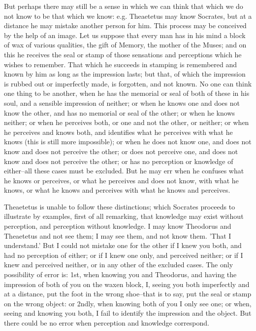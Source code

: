 But perhaps there may still be a sense in which we can think that
which we do not know to be that which we know: e.g. Theaetetus may know
Socrates, but at a distance he may mistake another person for him. This
process may be conceived by the help of an image. Let us suppose that
every man has in his mind a block of wax of various qualities, the gift
of Memory, the mother of the Muses; and on this he receives the seal or
stamp of those sensations and perceptions which he wishes to remember.
That which he succeeds in stamping is remembered and known by him as
long as the impression lasts; but that, of which the impression is
rubbed out or imperfectly made, is forgotten, and not known. No one can
think one thing to be another, when he has the memorial or seal of both
of these in his soul, and a sensible impression of neither; or when he
knows one and does not know the other, and has no memorial or seal of
the other; or when he knows neither; or when he perceives both, or one
and not the other, or neither; or when he perceives and knows both,
and identifies what he perceives with what he knows (this is still more
impossible); or when he does not know one, and does not know and does
not perceive the other; or does not perceive one, and does not know
and does not perceive the other; or has no perception or knowledge
of either--all these cases must be excluded. But he may err when he
confuses what he knows or perceives, or what he perceives and does not
know, with what he knows, or what he knows and perceives with what he
knows and perceives.

Theaetetus is unable to follow these distinctions; which Socrates
proceeds to illustrate by examples, first of all remarking, that
knowledge may exist without perception, and perception without
knowledge. I may know Theodorus and Theaetetus and not see them; I
may see them, and not know them. 'That I understand.' But I could not
mistake one for the other if I knew you both, and had no perception of
either; or if I knew one only, and perceived neither; or if I knew
and perceived neither, or in any other of the excluded cases. The only
possibility of error is: 1st, when knowing you and Theodorus, and having
the impression of both of you on the waxen block, I, seeing you both
imperfectly and at a distance, put the foot in the wrong shoe--that
is to say, put the seal or stamp on the wrong object: or 2ndly, when
knowing both of you I only see one; or when, seeing and knowing you
both, I fail to identify the impression and the object. But there could
be no error when perception and knowledge correspond.

